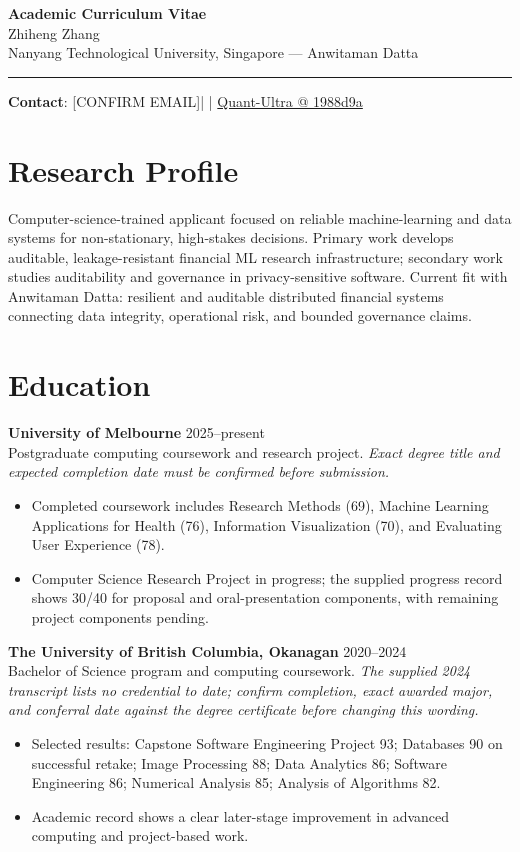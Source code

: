 \documentclass[11pt]{article}
\makeatletter
\newcommand{\ApplicantName}{Zhiheng Zhang}
\newcommand{\ApplicantEmail}{[CONFIRM EMAIL]}
\newcommand{\ApplicantPhone}{[CONFIRM PHONE]}
\newcommand{\ApplicantGitHub}{\href{https://github.com/zhiheng-zhang-Mera/Quant-Ultra/tree/1988d9a8530da91a8158de864d098ea869098923}{Quant-Ultra @ 1988d9a}}
\makeatother
\begin{document}
\begin{center}
{\LARGE\bfseries Academic Curriculum Vitae}\\[0.25em]
{\large \ApplicantName}\\
Nanyang Technological University, Singapore --- Anwitaman Datta
\end{center}
\vspace{0.35em}\hrule\vspace{0.65em}

\textbf{Contact}: \ApplicantEmail\quad | \quad \ApplicantPhone\quad | \quad \ApplicantGitHub

\section*{Research Profile}
Computer-science-trained applicant focused on reliable machine-learning and data systems for non-stationary, high-stakes decisions. Primary work develops auditable, leakage-resistant financial ML research infrastructure; secondary work studies auditability and governance in privacy-sensitive software. Current fit with Anwitaman Datta: resilient and auditable distributed financial systems connecting data integrity, operational risk, and bounded governance claims.

\section*{Education}
\textbf{University of Melbourne} \hfill 2025--present\\
Postgraduate computing coursework and research project. \textit{Exact degree title and expected completion date must be confirmed before submission.}
\begin{itemize}
\item Completed coursework includes Research Methods (69), Machine Learning Applications for Health (76), Information Visualization (70), and Evaluating User Experience (78).
\item Computer Science Research Project in progress; the supplied progress record shows 30/40 for proposal and oral-presentation components, with remaining project components pending.
\end{itemize}

\textbf{The University of British Columbia, Okanagan} \hfill 2020--2024\\
Bachelor of Science program and computing coursework. \textit{The supplied 2024 transcript lists no credential to date; confirm completion, exact awarded major, and conferral date against the degree certificate before changing this wording.}
\begin{itemize}
\item Selected results: Capstone Software Engineering Project 93; Databases 90 on successful retake; Image Processing 88; Data Analytics 86; Software Engineering 86; Numerical Analysis 85; Analysis of Algorithms 82.
\item Academic record shows a clear later-stage improvement in advanced computing and project-based work.
\end{itemize}
\end{document}
